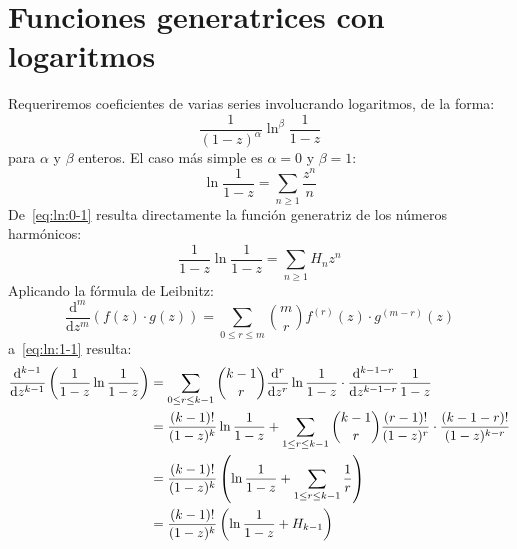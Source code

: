 %

\section{Funciones generatrices con logaritmos}
\label{sec:gf-logs}

  Requeriremos coeficientes de varias series involucrando logaritmos,
  de la forma:
  \begin{equation}
    \label{eq:ln:alpha-beta}
    \frac{1}{(1 - z)^\alpha} \ln^\beta \frac{1}{1 - z}
  \end{equation}
  para \(\alpha\) y \(\beta\) enteros.
  El caso más simple es \(\alpha = 0\) y \(\beta = 1\):
  \begin{equation}
    \label{eq:ln:0-1}
    \ln \frac{1}{1 - z}
      = \sum_{n \ge 1} \frac{z^n}{n}
  \end{equation}
  De~\eqref{eq:ln:0-1} resulta directamente
  la función generatriz de los números harmónicos:%
  \begin{equation}
    \label{eq:ln:1-1}
    \frac{1}{1 - z} \ln \frac{1}{1 - z}
      = \sum_{n \ge 1} H_n z^n
  \end{equation}
  Aplicando la fórmula de Leibnitz:%
  \begin{equation}
    \label{eq:Leibnitz-derivative}
    \frac{\mathrm{d}^m}{\mathrm{d} z^m} (f(z) \cdot g(z))
      = \sum_{0 \le r \le m} \binom{m}{r} f^{(r)}(z) \cdot g^{(m - r)}(z)
  \end{equation}
  a~\eqref{eq:ln:1-1} resulta:
  \begin{align}
    \frac{\mathrm{d}^{k - 1}}{\mathrm{d} z^{k - 1}}
      \left( \frac{1}{1 - z} \ln \frac{1}{1 - z} \right)
      &= \sum_{0 \le r \le k - 1}
	   \binom{k - 1}{r}
	      \frac{\mathrm{d}^r}{\mathrm{d} z^r} \ln \frac{1}{1 - z}
	      \cdot
	      \frac{\mathrm{d}^{k - 1 - r}}{\mathrm{d} z^{k - 1 - r}}
		 \frac{1}{1 - z}
		       \notag \\
      &= \frac{(k - 1)!}{(1 - z)^k} \ln \frac{1}{1 - z}
	   + \sum_{1 \le r \le k - 1}
	       \binom{k - 1}{r}
		 \frac{(r - 1)!}{(1 - z)^r}
		   \cdot \frac{(k - 1 - r)!}{(1 - z)^{k - r}}
		       \notag \\
      &= \frac{(k - 1)!}{(1 - z)^k}
	   \left(
	     \ln \frac{1}{1 - z}
	       + \sum_{1 \le r \le k - 1} \frac{1}{r}
	   \right)
		       \notag \\
      &= \frac{(k - 1)!}{(1 - z)^k}
	   \left(
	     \ln \frac{1}{1 - z}
	       + H_{k - 1}
	   \right)
  \end{align}
